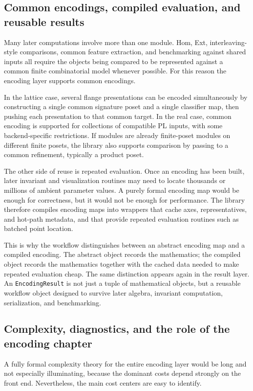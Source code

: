 \documentclass[11pt]{article}
\theoremstyle{definition}
\theoremstyle{remark}
\begin{document}
\subsection{Common encodings, compiled evaluation, and reusable results}

Many later computations involve more than one module.  Hom, Ext, interleaving-style comparisons, common feature extraction, and benchmarking against shared inputs all require the objects being compared to be represented against a common finite combinatorial model whenever possible.  For this reason the encoding layer supports common encodings.

In the lattice case, several flange presentations can be encoded simultaneously by constructing a single common signature poset and a single classifier map, then pushing each presentation to that common target.  In the real case, common encoding is supported for collections of compatible PL inputs, with some backend-specific restrictions.  If modules are already finite-poset modules on different finite posets, the library also supports comparison by passing to a common refinement, typically a product poset.

The other side of reuse is repeated evaluation.  Once an encoding has been built, later invariant and visualization routines may need to locate thousands or millions of ambient parameter values.  A purely formal encoding map would be enough for correctness, but it would not be enough for performance.  The library therefore compiles encoding maps into wrappers that cache axes, representatives, and hot-path metadata, and that provide repeated evaluation routines such as batched point location.

This is why the workflow distinguishes between an abstract encoding map and a compiled encoding.  The abstract object records the mathematics; the compiled object records the mathematics together with the cached data needed to make repeated evaluation cheap.  The same distinction appears again in the result layer.  An \texttt{EncodingResult} is not just a tuple of mathematical objects, but a reusable workflow object designed to survive later algebra, invariant computation, serialization, and benchmarking.

\subsection{Complexity, diagnostics, and the role of the encoding chapter}

A fully formal complexity theory for the entire encoding layer would be long and not especially illuminating, because the dominant costs depend strongly on the front end.  Nevertheless, the main cost centers are easy to identify.
\end{document}
